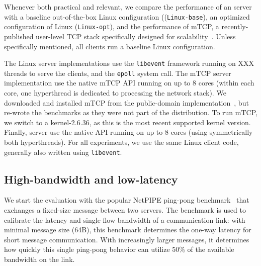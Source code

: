 

Whenever both practical and relevant, we compare the performance of an
\ix server with a baseline out-of-the-box Linux configuration
((\texttt{Linux-base}), an optimized configuration of Linux
(\texttt{Linux-opt}), and the performance of mTCP, a
recently-published user-level TCP stack specifically designed for
scalability~\cite{jeong2014mtcp}.  Unless specifically mentioned, all
clients run a baseline Linux configuration. 

The Linux server implementations use the \texttt{libevent} framework
running on XXX threads to serve the clients, and the \texttt{epoll} system call. The mTCP server
implementation use the native mTCP API running on up to 8 cores
(within each core, one hyperthread is dedicated to processing the
network stack).  We downloaded and installed mTCP
from the public-domain implementation~\cite{url:mtcp}, but re-wrote the
benchmarks as they were not part of the distribution.  To run mTCP, we
switch to a kernel-2.6.36, as this is the most recent supported kernel
version.
Finally, \ix server use
the native \ix API running on up to 8 cores (using symmetrically both
hyperthreads).  For all experiments, we use the same Linux client code, generally also written using \texttt{libevent}.


\subsection{High-bandwidth and low-latency}
\label{sec:eval:netpipe}




We start the evaluation with the popular NetPIPE ping-pong
benchmark~\cite{snell1996netpipe} that exchanges a fixed-size message
between two servers.  The benchmark is used to calibrate the latency
and single-flow bandwidth of a communication link: with minimal
message size (64B), this benchmark determines the one-way latency for
short message communication.  With increasingly larger messages, it
determines how quickly this single ping-pong behavior can utilize 50\%
of the available bandwidth on the link.


